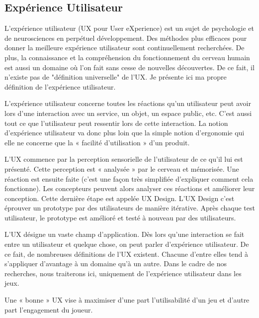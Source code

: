 \documentclass[11pt]{article}
\begin{document}
	\subsection{Expérience Utilisateur}\label{sec:UX}
		L'expérience utilisateur (UX pour User eXperience) est un sujet de psychologie et de neurosciences en perpétuel développement.
		Des méthodes plus efficaces pour donner la meilleure expérience utilisateur sont continuellement recherchées.
		De plus, la connaissance et la compréhension du fonctionnement du cerveau humain est aussi un domaine où l'on fait sans cesse de nouvelles découvertes.
		De ce fait, il n'existe pas de "définition universelle" de l'UX.
		Je présente ici ma propre définition de l'expérience utilisateur.\par
		L’expérience utilisateur concerne toutes les réactions qu’un utilisateur peut avoir lors d’une interaction avec un service, un objet, un espace public, etc.
		C’est aussi tout ce que l’utilisateur peut ressentir lors de cette interaction.
		La notion d’expérience utilisateur va donc plus loin que la simple notion d’ergonomie qui elle ne concerne que la « facilité d’utilisation » d’un produit.\par
		L’UX commence par la perception sensorielle de l’utilisateur de ce qu’il lui est présenté.
		Cette perception est « analysée » par le cerveau et mémorisée.
		Une réaction est ensuite faite (c'est une façon très simplifiée d'expliquer comment cela fonctionne).
		Les concepteurs peuvent alors analyser ces réactions et améliorer leur conception.
		Cette dernière étape est appelée UX Design.
		L’UX Design c’est éprouver un prototype par des utilisateurs de manière itérative.
		Après chaque test utilisateur, le prototype est amélioré et testé à nouveau par des utilisateurs.\par
		L’UX désigne un vaste champ d’application.
		Dès lors qu’une interaction se fait entre un utilisateur et quelque chose, on peut parler d’expérience utilisateur.
		De ce fait, de nombreuses définitions de l’UX existent.
		Chacune d’entre elles tend à s’appliquer d’avantage à un domaine qu’à un autre.
		Dans le cadre de nos recherches, nous traiterons ici, uniquement de l’expérience utilisateur dans les jeux.\par
		Une « bonne » UX vise à maximiser d’une part l’utilisabilité d’un jeu et d’autre part l’engagement du joueur.\par
\end{document}
